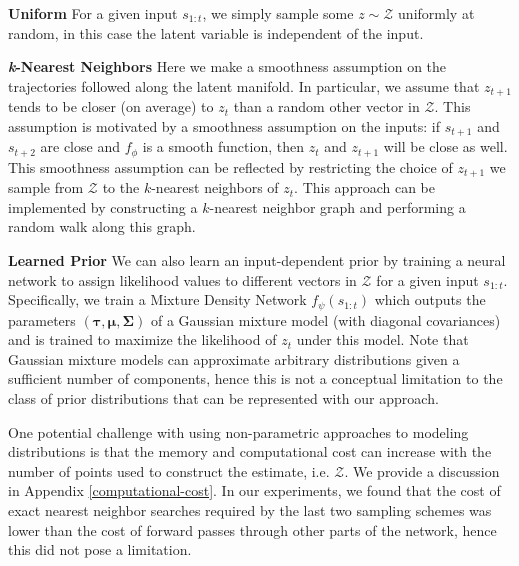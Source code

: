\documentclass{article}
\begin{document}


\textbf{Uniform} \quad
For a given input $s_{1:t}$, we simply sample some $z \sim \mathcal{Z}$ uniformly at random, in this case the latent variable is independent of the input.

\textbf{\emph{k}-Nearest Neighbors} \quad
Here we make a smoothness assumption on the trajectories followed along the latent manifold.
In particular, we assume that $z_{t+1}$ tends to be closer (on average) to $z_t$ than a random other vector in $\mathcal{Z}$.
This assumption is motivated by a smoothness assumption on the inputs: if $s_{t+1}$ and $s_{t+2}$ are close and $f_\phi$ is a smooth function, then $z_t$ and $z_{t+1}$ will be close as well.
This smoothness assumption can be reflected by restricting the choice of $z_{t+1}$ we sample from $\mathcal{Z}$ to the $k$-nearest neighbors of $z_t$.
This approach can be implemented by constructing a $k$-nearest neighbor graph and performing a random walk along this graph.

\textbf{Learned Prior} \quad
We can also learn an input-dependent prior by training a neural network to assign likelihood values to different vectors in $\mathcal{Z}$ for a given input $s_{1:t}$.
Specifically, we train a Mixture Density Network \citep{mixture-density-networks} $f_\psi(s_{1:t})$ which outputs the parameters $(\bm{\tau}, \bm{\mu}, \bm{\Sigma})$ of a Gaussian mixture model (with diagonal covariances) and is trained to maximize the likelihood of $z_t$ under this model.
Note that Gaussian mixture models can approximate arbitrary distributions given a sufficient number of components, hence this is not a conceptual limitation to the class of prior distributions that can be represented with our approach.

One potential challenge with using non-parametric approaches to modeling distributions is that the memory and computational cost can increase with the number of points used to construct the estimate, i.e. $\mathcal{Z}$.
We provide a discussion in Appendix \ref{computational-cost}.
In our experiments, we found that the cost of exact nearest neighbor searches required by the last two sampling schemes was lower than the cost of forward passes through other parts of the network, hence this did not pose a limitation.
\end{document}
